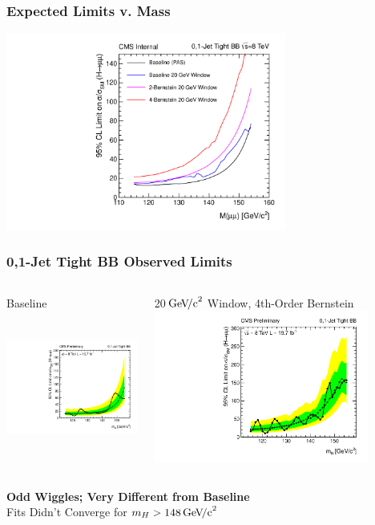 \documentclass{beamer}
\newcommand{\GeVcc}{\ensuremath{\,\mathrm{Ge\kern -0.1em V\!/c}^2}}
\begin{document}
\begin{frame}
\frametitle{Expected Limits v. Mass}
\begin{center}
  \includegraphics[height=65mm]{2013-10-25HggLimitFitRange2/comparisons/limitsCompareWidths}
\end{center}
\end{frame}

\begin{frame}
\frametitle{0,1-Jet Tight BB Observed Limits}
  \vspace{-1em}
  \begin{columns}[c]
   \column{60mm}
      \begin{center}
        Baseline \\
        \includegraphics[height=50mm]{2013-10-25HggLimitFitRange2/comparisons/BaselineBB}
      \end{center}
   \column{60mm}
      \begin{center}
        20\GeVcc{} Window, 4th-Order Bernstein
        \includegraphics[height=50mm]{2013-10-25HggLimitFitRange2/limitResults/Jets01PassPtG10BB_8TeV}
      \end{center}
  \end{columns}
\begin{center}
  \textbf{Odd Wiggles; Very Different from Baseline} \\ Fits Didn't Converge for $m_H>148\GeVcc{}$
\end{center}
\end{frame}
\end{document}
